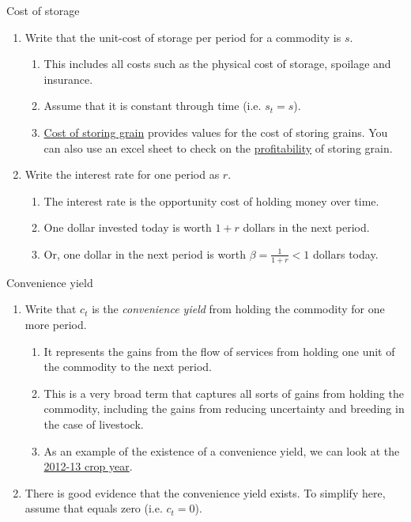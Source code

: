 \documentclass[table,xcolor=pdftex,dvipsnames, handout]{beamer}\usepackage[]{graphicx}\usepackage[]{color}
\begin{document}

\begin{frame}{Cost of storage}
\begin{enumerate}[label=\textbullet]
    \item Write that the unit-cost of storage per period for a commodity is $s$.
        \begin{enumerate}[label=-]
          \item This includes all costs such as the physical cost of storage, spoilage and insurance.
          \item Assume that it is constant through time (i.e. $s_t = s$).
          \item \href{https://www.extension.iastate.edu/agdm/crops/pdf/a2-33.pdf}{Cost of storing grain} provides values for the cost of storing grains. You can also use an excel sheet to check on the \href{https://www.extension.iastate.edu/agdm/cdmarkets.html}{profitability} of storing grain.
       \end{enumerate}
    \item Write the interest rate for one period as $r$.
        \begin{enumerate}[label=-]
          \item The interest rate is the opportunity cost of holding money over time.
          \item One dollar invested today is worth $1+r$ dollars in the next period.
          \item Or, one dollar in the next period is worth $\beta = \frac{1}{1+r} < 1$ dollars today.
       \end{enumerate}
\end{enumerate}
\end{frame}


\begin{frame}{Convenience yield}
\begin{enumerate}[label=\textbullet]
   \item Write that $c_t$ is the \emph{convenience yield} from holding the commodity for one more period.
       \begin{enumerate}[label=-]
         \item It represents the gains from the flow of services from holding one unit of the commodity to the next period.
         \item This is a very broad term that captures all sorts of gains from holding the commodity, including the gains from reducing uncertainty and breeding in the case of livestock.
         \item As an example of the existence of a convenience yield, we can look at the \href{http://usda.mannlib.cornell.edu/usda/waob/wasde//2010s/2013/wasde-08-12-2013.pdf}{2012-13 crop year}.
      \end{enumerate}
   \item There is good evidence that the convenience yield exists. To simplify here, assume that equals zero (i.e. $c_t=0$).
\end{enumerate}
\end{frame}
\end{document}
